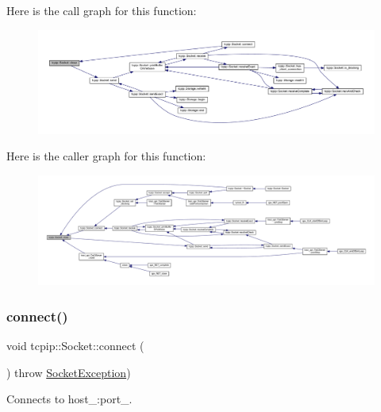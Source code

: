 Here is the call graph for this function\+:\nopagebreak
\begin{figure}[H]
\begin{center}
\leavevmode
\includegraphics[width=350pt]{classtcpip_1_1_socket_adda6f45e2b5fabc7f539f4ddcbe4b144_cgraph}
\end{center}
\end{figure}
Here is the caller graph for this function\+:\nopagebreak
\begin{figure}[H]
\begin{center}
\leavevmode
\includegraphics[width=350pt]{classtcpip_1_1_socket_adda6f45e2b5fabc7f539f4ddcbe4b144_icgraph}
\end{center}
\end{figure}
\mbox{\label{classtcpip_1_1_socket_a8f89d187776729d15db3ba5c99c36acd}} 
\subsubsection{\texorpdfstring{connect()}{connect()}}
{\footnotesize\ttfamily void tcpip\+::\+Socket\+::connect (\begin{DoxyParamCaption}{ }\end{DoxyParamCaption}) throw  \hyperlink{classtcpip_1_1_socket_exception}{Socket\+Exception}) }



Connects to host\+\_\+\+:port\+\_\+. 

